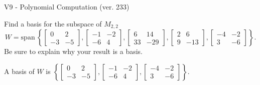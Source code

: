 \begin{exercise}
  \begin{exerciseTitle}V9 - Polynomial Computation (ver. 233)\end{exerciseTitle}
  \begin{exerciseStatement}
    Find a basis for the subspace of \(M_{2,2}\) 
\[W=\mathrm{span}\ \left\{\left[\begin{array}{cc}
0 & 2 \\
-3 & -5
\end{array}\right] , \left[\begin{array}{cc}
-1 & -2 \\
-6 & 4
\end{array}\right] , \left[\begin{array}{cc}
6 & 14 \\
33 & -29
\end{array}\right] , \left[\begin{array}{cc}
2 & 6 \\
9 & -13
\end{array}\right] , \left[\begin{array}{cc}
-4 & -2 \\
3 & -6
\end{array}\right]\right\}.\]
 Be sure to explain why your result is a basis.


  \end{exerciseStatement}
  \begin{exerciseAnswer}
   A basis of \(W\) is  \(\left\{\left[\begin{array}{cc}
0 & 2 \\
-3 & -5
\end{array}\right] , \left[\begin{array}{cc}
-1 & -2 \\
-6 & 4
\end{array}\right] , \left[\begin{array}{cc}
-4 & -2 \\
3 & -6
\end{array}\right]\right\}\).
  


  \end{exerciseAnswer}
\end{exercise}